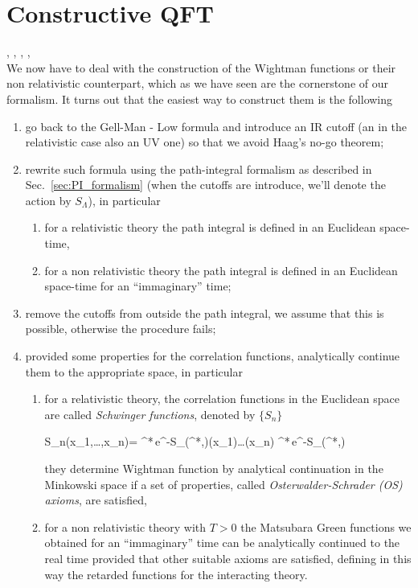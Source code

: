 \documentclass[../main/main.tex]{subfiles}
\begin{document}
\chapter{Constructive QFT}

\cite[Pages 185-191]{Streater:2000}, \cite{Summers:2016}, \cite{Wightman:1976}, \cite[Section 5.1]{Strocchi_2013}, \cite[Section 6.1, Chapter 19]{Glimm:1987}\\

We now have to deal with the construction of the Wightman functions or their non relativistic counterpart, which as we have seen are the cornerstone of our formalism. It turns out that the easiest way to construct them is the following
\begin{enumerate}[label=(\arabic*)]
	\item go back to the Gell-Man - Low formula and introduce an IR cutoff (an in the relativistic case also an UV one) so that we avoid Haag's no-go theorem;
	\item rewrite such formula using the path-integral formalism as described in Sec.~\ref{sec:PI_formalism} (when the cutoffs are introduce, we'll denote the action by $S_\Lambda$), in particular
	\begin{enumerate}[label=(\alph*)]
		\item for a relativistic theory the path integral is defined in an Euclidean space-time,
		\item for a non relativistic theory the path integral is defined in an Euclidean space-time for an ``immaginary'' time;
	\end{enumerate}
	\item remove the cutoffs from outside the path integral, we assume that this is possible, otherwise the procedure fails;
	\item provided some properties for the correlation functions, analytically continue them to the appropriate space, in particular
	\begin{enumerate}[label=(\alph*)]
		\item for a relativistic theory, the correlation functions in the Euclidean space are called \emph{Schwinger functions}, denoted by $\{S_n\}$
		\begin{eq}
			S_n(x_1,\ldots,x_n)=\limcutrem \frac%
			{\int\pide\phi\pide\phi^*\,e^{-S_\Lambda(\phi^*,\phi)}\phi(x_1)\ldots\phi(x_n)}
			{\int\pide\phi\pide\phi^*\,e^{-S_\Lambda(\phi^*,\phi)}}
		\end{eq}
		they determine Wightman function by analytical continuation in the Minkowski space if a set of properties, called \emph{Osterwalder-Schrader (OS) axioms}, are satisfied,
		\item for a non relativistic theory with $T>0$ the Matsubara Green functions we obtained for an ``immaginary'' time can be analytically continued to the real time provided that other suitable axioms are satisfied, defining in this way the retarded functions for the interacting theory.
	\end{enumerate}
\end{enumerate}
\end{document}
